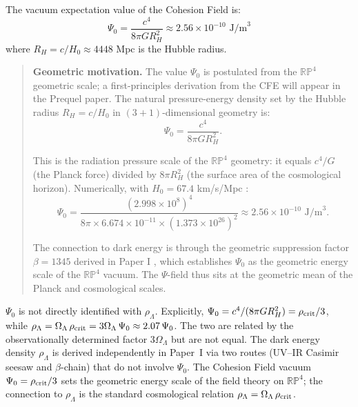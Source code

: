 \begin{postulate}
The vacuum expectation value of the Cohesion Field is:
\begin{equation}
\Psi_0 = \frac{c^4}{8\pi GR_H^2} \approx 2.56 \times 10^{-10} \text{ J/m}^3
\label{eq:psi_zero}
\end{equation}
where $R_H = c/H_0 \approx 4448$ Mpc is the Hubble radius.
\end{postulate}
\begin{quote}\textbf{Geometric motivation.}
The value $\Psi_0$ is postulated from the $\mathbb{RP}^4$ geometric scale;
a first-principles derivation from the CFE will appear in the Prequel paper.
The natural pressure-energy density set by the Hubble radius $R_H = c/H_0$ in $(3+1)$-dimensional geometry is:
\begin{equation}
\Psi_0 = \frac{c^4}{8\pi G R_H^2}.
\end{equation}

This is the radiation pressure scale of the $\mathbb{RP}^4$ geometry: it equals $c^4/G$ (the Planck force) divided by $8\pi R_H^2$ (the surface area of the cosmological horizon). Numerically, with $H_0 = 67.4$ km/s/Mpc \citep{Peacock2026a}:
\begin{equation}
\Psi_0 = \frac{(2.998\times10^8)^4}{8\pi \times 6.674\times10^{-11} \times (1.373\times10^{26})^2} \approx 2.56 \times 10^{-10} \text{ J/m}^3.
\end{equation}

The connection to dark energy is through the geometric suppression factor $\beta = 1345$ derived in Paper I \citep{Peacock2026a}, which establishes $\Psi_0$ as the geometric energy scale of the $\mathbb{RP}^4$ vacuum. The $\Psi$-field thus sits at the geometric mean of the Planck and cosmological scales.
\end{quote}

\begin{remark}
$\Psi_0$ is not directly identified with $\rho_\Lambda$.
Explicitly, $\Psi_0 = c^4/(8\pi G R_H^2) = \rho_{\rm crit}/3$,
while $\rho_\Lambda = \Omega_\Lambda\,\rho_{\rm crit} = 3\Omega_\Lambda\,\Psi_0 \approx 2.07\,\Psi_0$.
The two are related by the observationally determined factor $3\Omega_\Lambda$ but are not equal.
The dark energy density $\rho_\Lambda$ is derived independently in Paper~I \citep{Peacock2026a}
via two routes (UV--IR Casimir seesaw and $\beta$-chain) that do not involve $\Psi_0$.
The Cohesion Field vacuum $\Psi_0 = \rho_{\rm crit}/3$ sets the geometric energy scale
of the field theory on $\mathbb{RP}^4$; the connection to $\rho_\Lambda$ is
the standard cosmological relation $\rho_\Lambda = \Omega_\Lambda\,\rho_{\rm crit}$.
\end{remark}

